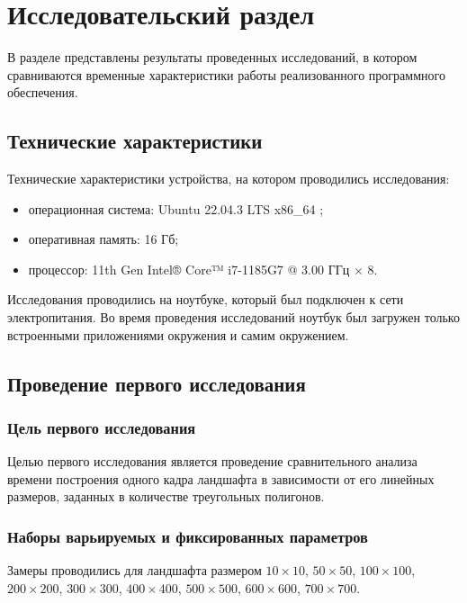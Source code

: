 \chapter{Исследовательский раздел}


В разделе представлены результаты проведенных исследований, в котором сравниваются временные характеристики работы реализованного
программного обеспечения.

\section{Технические характеристики}

Технические характеристики устройства, на котором проводились исследования: 

\begin{itemize}[label=--]
	\item операционная система: Ubuntu 22.04.3 LTS x86\_64 \cite{info_os};
	\item оперативная память: 16 Гб;
	\item процессор: 11th Gen Intel® Core™ i7-1185G7 @ 3.00 ГГц × 8.
\end{itemize}

Исследования проводились на ноутбуке, который был подключен к сети электропитания. Во время проведения исследований ноутбук был загружен только встроенными приложениями окружения и самим окружением.

\section{Проведение первого исследования}

\subsection{Цель первого исследования}

Целью первого исследования является проведение сравнительного анализа времени построения одного кадра ландшафта в зависимости от его линейных размеров, заданных в количестве треугольных полигонов. 

\clearpage

\subsection{Наборы варьируемых и фиксированных параметров}

Замеры проводились для ландшафта размером $10\times10$, $50\times50$, $100\times100$, $200\times200$, $300\times300$, $400\times400$, $500\times500$, $600\times600$, $700\times700$.

